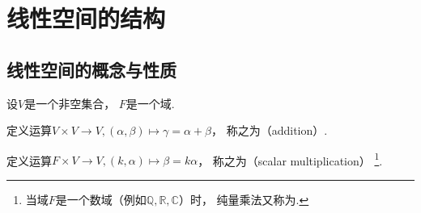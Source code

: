 \section{线性空间的结构}
\subsection{线性空间的概念与性质}
\begin{definition}
设\(V\)是一个非空集合，
\(F\)是一个域.

定义运算\(V\times V\to V,(\alpha,\beta)\mapsto\gamma=\alpha+\beta\)，
称之为（addition）.

定义运算\(F\times V\to V,(k,\alpha)\mapsto\beta=k\alpha\)，
称之为（scalar multiplication）
\footnote{
	当域\(F\)是一个数域（例如\(\mathbb{Q},\mathbb{R},\mathbb{C}\)）时，
	纯量乘法又称为.
}.


\end{definition}

